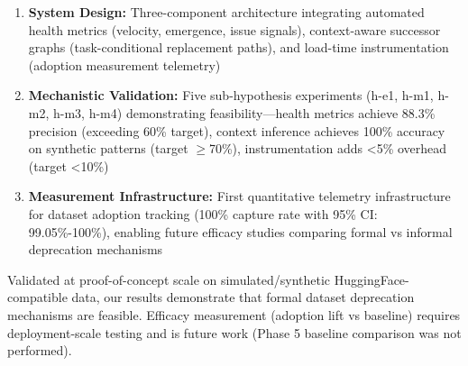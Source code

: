 \begin{enumerate}
\item \textbf{System Design:} Three-component architecture integrating automated health metrics (velocity, emergence, issue signals), context-aware successor graphs (task-conditional replacement paths), and load-time instrumentation (adoption measurement telemetry)

\item \textbf{Mechanistic Validation:} Five sub-hypothesis experiments (h-e1, h-m1, h-m2, h-m3, h-m4) demonstrating feasibility---health metrics achieve 88.3\% precision (exceeding 60\% target), context inference achieves 100\% accuracy on synthetic patterns (target $\geq$70\%), instrumentation adds <5\% overhead (target <10\%)

\item \textbf{Measurement Infrastructure:} First quantitative telemetry infrastructure for dataset adoption tracking (100\% capture rate with 95\% CI: 99.05\%-100\%), enabling future efficacy studies comparing formal vs informal deprecation mechanisms
\end{enumerate}

Validated at proof-of-concept scale on simulated/synthetic HuggingFace-compatible data, our results demonstrate that formal dataset deprecation mechanisms are feasible. Efficacy measurement (adoption lift vs baseline) requires deployment-scale testing and is future work (Phase 5 baseline comparison was not performed).
